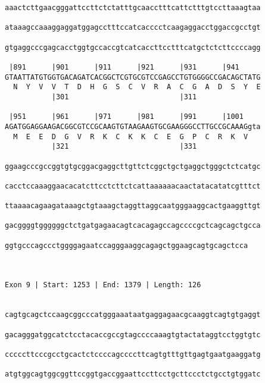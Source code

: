 \documentclass{article}
\begin{document}
\begin{Verbatim}
aaactcttgaacgggattccttctctatttgcaacctttcattctttgtccttaaagtaa
                                                            
ataaagccaaaggaggatggagcctttccatcacccctcaagaggacctggaccgcctgt
                                                            
gtgaggcccgagcacctggtgccaccgtcatcaccttcctttcatgctctcttccccagg
                                                            
 |891      |901      |911      |921      |931      |941     
GTAATTATGTGGTGACAGATCACGGCTCGTGCGTCCGAGCCTGTGGGGCCGACAGCTATG
  N  Y  V  V  T  D  H  G  S  C  V  R  A  C  G  A  D  S  Y  E
           |301                          |311               
  
 |951      |961      |971      |981      |991      |1001    
AGATGGAGGAAGACGGCGTCCGCAAGTGTAAGAAGTGCGAAGGGCCTTGCCGCAAAGgta
  M  E  E  D  G  V  R  K  C  K  K  C  E  G  P  C  R  K  V   
           |321                          |331               
  
ggaagcccgccggtgtgcggacgaggcttgttctcggctgctgaggctgggctctcatgc
                                                            
cacctccaaaggaacacatcttcctcttctcattaaaaaacaactatacatatcgtttct
                                                            
ttaaaacagaagataaagctgtaaagctaggttaggcaatgggaaggcactgaaggttgt
                                                            
gacggggtggggggctctgatgagaacagtcacagagccagccccgctcagcagctgcca
                                                            
ggtgcccagccctggggagaatccagggaaggcagagctggaagcagtgcagctcca
                                                         
                                                         
 
Exon 9 | Start: 1253 | End: 1379 | Length: 126


cagtgcagctccaagcggcccatgggaaataatgaggagaacgcaaggtcagtgtgaggt
                                                            
gacagggatggcatctcctacaccgccgtagccccaaagtgtactataggtcctggtgtc
                                                            
cccccttcccgcctgcactctccccagccccttcagtgtttgttgagtgaatgaaggatg
                                                            
atgtggcagtggcggttccggtgaccggaattccttcctgcttccctctgcctgtggatc
                                                            

\end{Verbatim}
\end{document}
